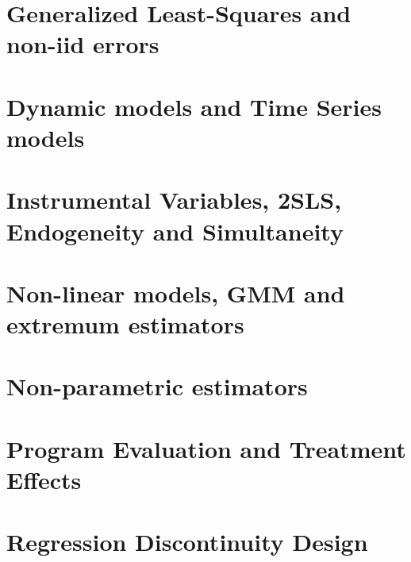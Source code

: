 \documentclass[12pt]{report} %
\begin{document}


\chapter{Generalized Least-Squares and non-iid errors}



\chapter{Dynamic models and Time Series models}



\chapter{Instrumental Variables, 2SLS, Endogeneity and Simultaneity}



\chapter{Non-linear models, GMM and extremum estimators}



\chapter{Non-parametric estimators}



\chapter{Program Evaluation and Treatment Effects}



\chapter{Regression Discontinuity Design}


\end{document}
